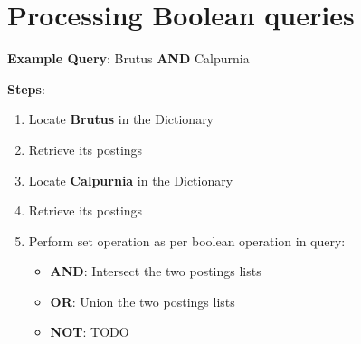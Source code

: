 \section{Processing Boolean queries \cite{ir-1}}\label{Processing Boolean queries}

\textbf{Example Query}: Brutus \textbf{AND} Calpurnia

\vspace{0.2cm}
\textbf{Steps}:
\begin{enumerate}
    \item Locate \textbf{Brutus} in the Dictionary

    \item Retrieve its postings

    \item Locate \textbf{Calpurnia} in the Dictionary

    \item Retrieve its postings

    \item Perform set operation as per boolean operation in query:
    \begin{itemize}
        \item \textbf{AND}: Intersect the two postings lists
        \item \textbf{OR}: Union the two postings lists
        \item \textbf{NOT}: TODO
    \end{itemize}

    
\end{enumerate}


